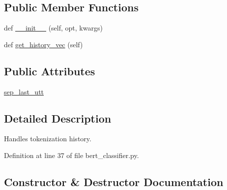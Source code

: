 \subsection*{Public Member Functions}
\begin{DoxyCompactItemize}
\item 
def \hyperlink{classparlai_1_1agents_1_1bert__classifier_1_1bert__classifier_1_1BertClassifierHistory_ae42446cb8bcb68591503e41ed7744666}{\+\_\+\+\_\+init\+\_\+\+\_\+} (self, opt, kwargs)
\item 
def \hyperlink{classparlai_1_1agents_1_1bert__classifier_1_1bert__classifier_1_1BertClassifierHistory_ac5a9d856cbb3e3994e6c99dbb1578b13}{get\+\_\+history\+\_\+vec} (self)
\end{DoxyCompactItemize}
\subsection*{Public Attributes}
\begin{DoxyCompactItemize}
\item 
\hyperlink{classparlai_1_1agents_1_1bert__classifier_1_1bert__classifier_1_1BertClassifierHistory_ab53ecd52f1f23b1ea488637cc8fd8068}{sep\+\_\+last\+\_\+utt}
\end{DoxyCompactItemize}


\subsection{Detailed Description}
\begin{DoxyVerb}Handles tokenization history.
\end{DoxyVerb}
 

Definition at line 37 of file bert\+\_\+classifier.\+py.



\subsection{Constructor \& Destructor Documentation}
\mbox{\label{classparlai_1_1agents_1_1bert__classifier_1_1bert__classifier_1_1BertClassifierHistory_ae42446cb8bcb68591503e41ed7744666}} 
